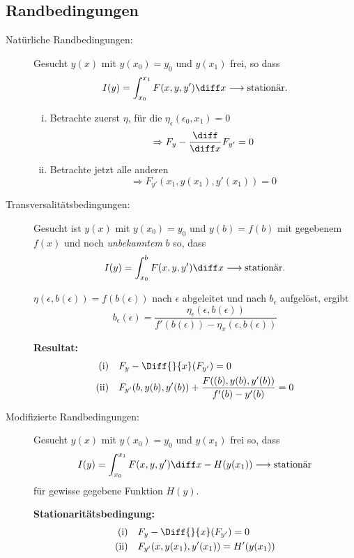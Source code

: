 	\subsection{Randbedingungen} %
		\begin{description}
			\item[Natürliche Randbedingungen:]
				Gesucht $y(x)$ mit $y(x_0) = y_0$ und $y(x_1)$ frei, so dass 
				\[
					I(y) = \int_{x_0}^{x_1} F(x,y,y') \diff x \longrightarrow \text{stationär.}
				\]
			
				\begin{enumerate}[(i)]
					\item Betrachte zuerst $\eta$, für die $\eta_\epsilon(\epsilon_0, x_1) = 0$
						\[
							\Rightarrow F_y - \frac{\diff}{\diff x} F_{y'} = 0
						\]
					\item Betrachte jetzt alle anderen
						\[
							\Rightarrow F_{y'}(x_1, y(x_1), y'(x_1)) = 0
						\]
				\end{enumerate}
			
			\item[Transversalitätsbedingungen:]
				Gesucht ist $y(x)$ mit $y(x_0) = y_0$ und $y(b) = f(b)$ mit gegebenem $f(x)$ und noch \emph{unbekanntem} $b$ so, dass
				\[
					I(y) = \int_{x_0}^b F(x,y,y') \diff x \longrightarrow \text{stationär.}
				\]
				
				$\eta(\epsilon,b(\epsilon)) = f(b(\epsilon))$ nach $\epsilon$ abgeleitet und nach $b_\epsilon$ aufgelöst, ergibt
				\[
					b_\epsilon(\epsilon) = \frac{\eta_\epsilon(\epsilon,b(\epsilon))}{f'(b(\epsilon)) - \eta_x(\epsilon,b(\epsilon))} 
				\]
				
				\textbf{Resultat:}
				\begin{align*}
					\text{(i)}\quad &F_y - \Diff{}{x} (F_{y'}) = 0 \\
					\text{(ii)}\quad &F_{y'}(b, y(b), y'(b)) + \frac{F((b),y(b),y'(b))}{f'(b) - y'(b)} = 0
				\end{align*}
			
			\item[Modifizierte Randbedingungen:]
				Gesucht $y(x)$ mit $y(x_0) = y_0$ und $y(x_1)$ frei so, dass
				\[
					I(y) = \int_{x_0}^{x_1} F(x,y,y') \diff x - H(y(x_1)) \longrightarrow \text{stationär}
				\]
				für gewisse gegebene Funktion $H(y)$.
				
				\textbf{Stationaritätsbedingung:}
				\begin{align*}
					\text{(i)}\quad &F_y - \Diff{}{x} (F_{y'}) = 0 \\
					\text{(ii)}\quad &F_{y'}(x, y(x_1), y'(x_1)) = H'(y(x_1))
				\end{align*}
		\end{description}
	
